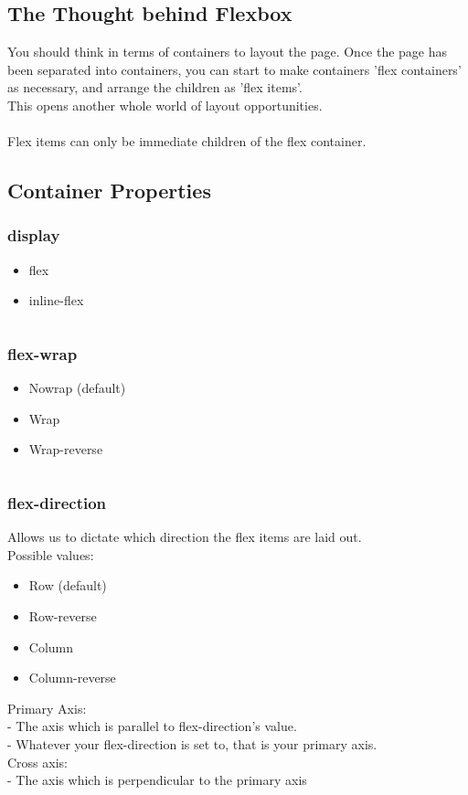 \documentclass[]{article}
\newcommand{\<}{\guilsinglleft}
\renewcommand{\>}{\guilsinglright}
\begin{document}
\subsection{The Thought behind Flexbox}
You should think in terms of containers to layout the page.  Once the page has been separated into containers, you can start to make containers 'flex containers' as necessary, and arrange the children as 'flex items'.  
\\
This opens another whole world of layout opportunities.
\\\\
Flex items can only be immediate children of the flex container.

\subsection{Container Properties}
\subsubsection{display}
\begin{itemize}
	\item flex
	\item inline-flex
\end{itemize}
\begin{lstlisting}
\end{lstlisting}

\subsubsection{flex-wrap}
\begin{itemize}
	\item Nowrap (default)
	\item Wrap
	\item Wrap-reverse
\end{itemize}
\begin{lstlisting}
\end{lstlisting}

\subsubsection{flex-direction}
Allows us to dictate which direction the flex items are laid out.
\\
Possible values:
\begin{itemize}
	\item Row (default)
	\item Row-reverse
	\item Column
	\item Column-reverse
\end{itemize}
Primary Axis:\\
 - The axis which is parallel to flex-direction’s value.\\
 - Whatever your flex-direction is set to, that is your primary axis.
 \\
Cross axis:\\
 - The axis which is perpendicular to the primary axis
\\
\begin{lstlisting}
\end{lstlisting}
\end{document}
